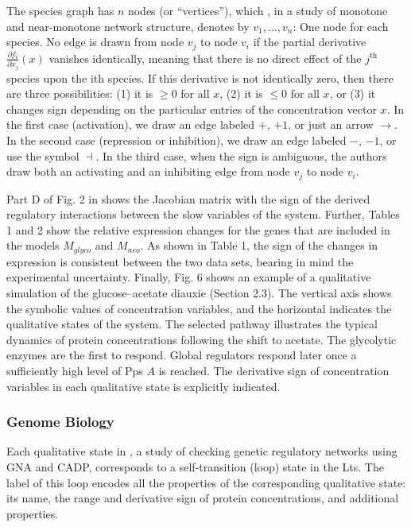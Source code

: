 \documentclass[11pt]{book}
\begin{document}
The species graph has $n$ nodes (or ``vertices''), which \cite{sontag2006monotone}, in a study of monotone and near-monotone network structure,
denotes by $v_{1},\ldots,v_{n}$: One node for each species. No edge
is drawn from node $v_{j}$ to node $v_{i}$ if the partial derivative
$\frac{\partial f_{i}}{\partial x_{j}}\left(x\right)$ vanishes identically,
meaning that there is no direct effect of the $j^{\text{th}}$ species
upon the ith species. If this derivative is not identically zero,
then there are three possibilities: (1) it is $\geq0$ for all $x$,
(2) it is $\leq0$ for all $x$, or (3) it changes sign depending
on the particular entries of the concentration vector $x$. In the
first case (activation), we draw an edge labeled $+$, $+1$, or just
an arrow $\rightarrow$. In the second case (repression or inhibition),
we draw an edge labeled $-$, $-1$, or use the symbol $\dashv$.
In the third case, when the sign is ambiguous, the authors draw both
an activating and an inhibiting edge from node $v_{j}$ to node $v_{i}$.

Part D of Fig. 2 in \cite{baldazzi2012importance} shows the Jacobian
matrix with the sign of the derived regulatory interactions between
the slow variables of the system. Further, Tables 1 and 2 show the
relative expression changes for the genes that are included in the
models $M_{glyco}$ and $M_{neo}$. As shown in Table 1, the sign
of the changes in expression is consistent between the two data sets,
bearing in mind the experimental uncertainty. Finally, Fig. 6 shows
an example of a qualitative simulation of the glucose--acetate diauxie
(Section 2.3). The vertical axis shows the symbolic values of concentration
variables, and the horizontal indicates the qualitative states of
the system. The selected pathway illustrates the typical dynamics
of protein concentrations following the shift to acetate. The glycolytic
enzymes are the first to respond. Global regulators respond later
once a sufficiently high level of Pps $A$ is reached. The derivative
sign of concentration variables in each qualitative state is explicitly
indicated.


\subsubsection{Genome Biology}

Each qualitative state in \cite{batt2004model}, a study of checking genetic regulatory networks using GNA and CADP, corresponds to a self-transition
(loop) state in the Lts. The label of this loop encodes all the properties
of the corresponding qualitative state: its name, the range and derivative
sign of protein concentrations, and additional properties.
\end{document}
